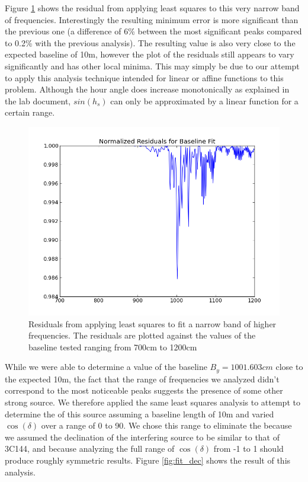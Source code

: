 \documentclass{article}
\begin{document}
    Figure \ref{fig:residual_baseline} shows the residual from applying least
    squares to this very narrow band of frequencies. Interestingly the resulting
    minimum error is more significant than the previous one (a difference of 6\%
    between the most significant peaks compared to 0.2\% with the previous
    analysis). The resulting value is also very close to the expected baseline
    of 10m, however the plot of the residuals still appears to vary
    significantly and has other local minima. This may simply be due to our
    attempt to apply this analysis technique intended for linear or affine
    functions to this problem.  Although the hour angle does increase
    monotonically as explained in the lab document, $sin(h_{s})$ can only be
    approximated by a linear function for a certain range.

    \begin{figure}[h!]
    \centering
    \includegraphics[scale=0.5]{img/crab/residual_baseline.png}
    \caption{Residuals from applying least squares to fit a narrow band of higher
    frequencies. The residuals are plotted against the values of the baseline
tested ranging from 700cm to 1200cm}
    \label{fig:residual_baseline}
    \end{figure}

    While we were able to determine a value of the baseline $B_y=1001.603cm$ close to the
    expected 10m, the fact that the range of frequencies we analyzed didn't
    correspond to the most noticeable peaks suggests the presence of some other strong
    source. We therefore applied the same least squares analysis to attempt to
    determine the of this source assuming a baseline length of 10m and varied
    $\cos(\delta)$ over a range of 0 to 90. We chose this range to eliminate the
    because we assumed the declination of the interfering source to be similar
    to that of 3C144, and because analyzing the full range of $\cos(\delta)$
    from -1 to 1 should produce roughly symmetric results. Figure \ref{fig:fit_dec} shows the result of this analysis.
\end{document}
